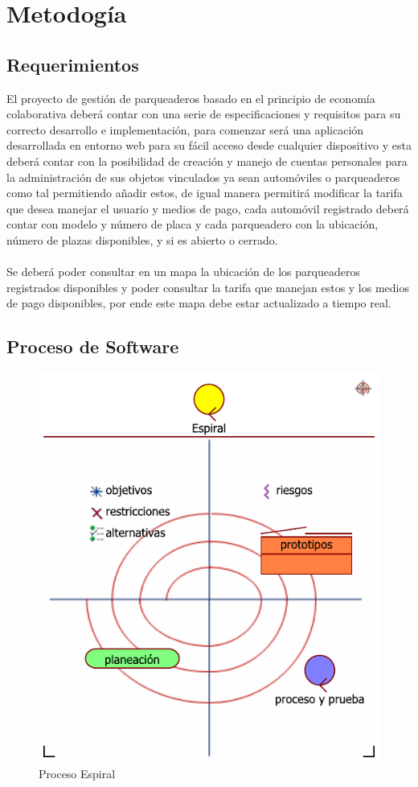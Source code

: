 \chapter{Metodogía}
\section{Requerimientos}
El proyecto de gestión de parqueaderos basado en el principio de economía colaborativa deberá contar con una serie de especificaciones y requisitos para su correcto desarrollo e implementación, para comenzar será una aplicación desarrollada en entorno web para su fácil acceso desde cualquier dispositivo y esta deberá contar con la posibilidad de creación y manejo de cuentas personales para la administración de sus objetos vinculados ya sean automóviles o parqueaderos como tal permitiendo añadir estos, de igual manera permitirá modificar la tarifa que desea manejar el usuario y medios de pago, cada automóvil registrado deberá contar con modelo y número de placa y cada parqueadero con la ubicación, número de plazas disponibles, y si es abierto o cerrado.
\\
\\
Se deberá poder consultar en un mapa la ubicación de los parqueaderos registrados disponibles y poder consultar la tarifa que manejan estos  y los medios de pago disponibles, por ende este mapa debe estar actualizado a tiempo real.

\newpage

\section{Proceso de Software}

\begin{figure}[h!]
	\centering
	\includegraphics[width=0.7\linewidth]{imgs/espiral}
	\caption[Espiral]{Proceso Espiral}
\end{figure}
